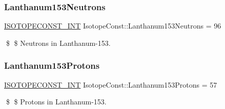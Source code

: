 \subsubsection{\texorpdfstring{Lanthanum153\+Neutrons}{Lanthanum153Neutrons}}
{\footnotesize\ttfamily \mbox{\hyperlink{group___isotope_const-_macros_ga5f18360b3e99483a35c32d789e62621c}{I\+S\+O\+T\+O\+P\+E\+C\+O\+N\+S\+T\+\_\+\+I\+NT}} Isotope\+Const\+::\+Lanthanum153\+Neutrons = 96}

\$ \$ Neutrons in Lanthanum-\/153. \mbox{\label{group___isotope_const-_lanthanum-_la153_gafed35a9f810a5ba3d48abc9d3ffe3851}} 
\subsubsection{\texorpdfstring{Lanthanum153\+Protons}{Lanthanum153Protons}}
{\footnotesize\ttfamily \mbox{\hyperlink{group___isotope_const-_macros_ga5f18360b3e99483a35c32d789e62621c}{I\+S\+O\+T\+O\+P\+E\+C\+O\+N\+S\+T\+\_\+\+I\+NT}} Isotope\+Const\+::\+Lanthanum153\+Protons = 57}

\$ \$ Protons in Lanthanum-\/153. 